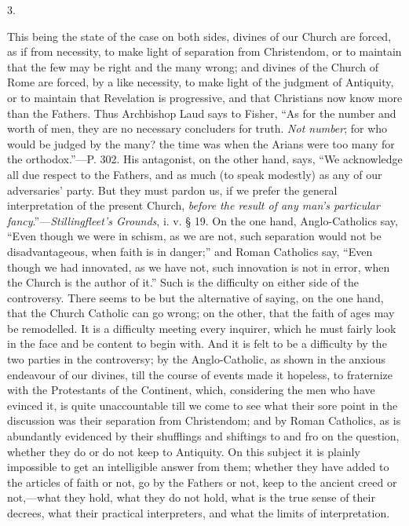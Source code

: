 3.

This being the state of the case on both sides,
divines of our Church are forced, as if from necessity, to make light
of separation from Christendom, or to maintain that the few may be
right and the many wrong; and divines of the Church of Rome are
forced, by a like necessity, to make light of the judgment of
Antiquity, or to maintain that Revelation is progressive, and that
Christians now know more than the Fathers. Thus Archbishop Laud says
to Fisher, ``As for the number and worth of men, they are no necessary
concluders for truth. \emph{Not number}; for who would be judged by
the many? the time was when the Arians were too many for the orthodox.''—P.
302. His antagonist, on the other hand, says, ``We acknowledge all due
respect to the Fathers, and as much (to speak modestly) as any of our
adversaries' party. But they must pardon us, if we prefer the
general interpretation of the present Church, \emph{before the result of
any man's particular fancy}.''—\emph{Stillingfleet's Grounds}, i.
v. § 19. On the one hand, Anglo-Catholics say, ``Even though we were
in schism, as we are not, such separation would not be
disadvantageous, when faith is in danger;'' and Roman Catholics say, ``Even
though we had innovated, as we have not, such innovation is not in
error, when the Church is the author of it.'' Such is the difficulty on
either side of the controversy. There seems to be but the alternative
of saying, on the one hand, that the Church Catholic can go wrong; on
the other, that the faith of ages may be remodelled. It is a
difficulty meeting every inquirer, which he must fairly look in the
face and be content to begin with. And it is felt to be a difficulty
by the two parties in the controversy; by the Anglo-Catholic, as shown
in the anxious endeavour of our divines, till the course of events
made it hopeless, to fraternize with the Protestants of the Continent,
which, considering the men who have evinced it, is quite unaccountable
till we come to see what their sore point in the discussion was their
separation from Christendom; and by Roman Catholics, as is abundantly
evidenced by their shufflings and shiftings to and fro on the
question, whether they do or do not keep to Antiquity. On this subject
it is plainly impossible to get an intelligible answer from them;
whether they have added to the articles of faith or not, go by the
Fathers or not, keep to the ancient creed or not,—what they hold,
what they do not hold, what is the true sense of their decrees, what
their practical interpreters, and what the limits of interpretation.

